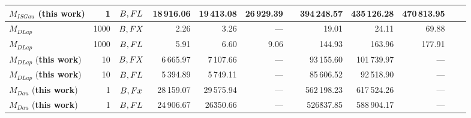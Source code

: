 \begin{table}
{\begin{tabular}{ l r c r r r r r r r r r}
            \midrule
            $M_{ISGau}$ (\textbf{this work})                     & 1       & $B,FL$ & 18\,916.06              & 19\,413.08 & 26\,929.39              &  & 394\,248.57 & 435\,126.28 & 470\,813.95 \\
            \midrule
            $M_{DLap}$~\cite{eigner2014differentially}           & 1000    & $B,FX$ & 2.26                    & 3.26       & ---                     &  & 19.01       & 24.11       & 69.88       \\
            $M_{DLap}$~\cite{eigner2014differentially}           & 1000    & $B,FL$ & 5.91                    & 6.60       & 9.06                    &  & 144.93      & 163.96      & 177.91      \\
            $M_{DLap}$ (\textbf{this work})                      & 10      & $B,FX$ & 6\,665.97               & 7\,107.66  & ---                     &  & 93\,155.60  & 101\,739.97 & ---         \\
            $M_{DLap}$ (\textbf{this work})                      & 10      & $B,FL$ & 5\,394.89               & 5\,749.11  & ---                     &  & 85\,606.52  & 92\,518.90  & ---         \\
            \midrule
            $M_{Dau}$ (\textbf{this work})                       & 1       & $B,Fx$ & 28\,159.07              & 29\,575.94 & ---                     &  & 562\,198.23 & 617\,524.26 & ---         \\
            $M_{Dau}$ (\textbf{this work})                       & 1       & $B,FL$ & 24\,906.67              & 26\.350.66 & ---                     &  & 526\.837.85 & 588\,904.17 & ---         \\
            \bottomrule
        \end{tabular}
    }
\end{table}
\FloatBarrier














